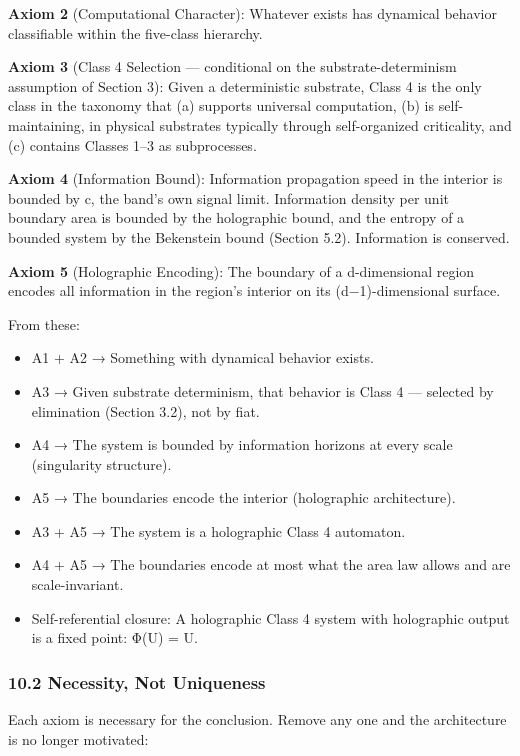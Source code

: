 \documentclass[
]{article}
\providecommand{\tightlist}{%
  \setlength{\itemsep}{0pt}\setlength{\parskip}{0pt}}
\begin{document}
\textbf{Axiom 2} (Computational Character): Whatever exists has
dynamical behavior classifiable within the five-class hierarchy.

\textbf{Axiom 3} (Class 4 Selection --- conditional on the
substrate-determinism assumption of Section 3): Given a deterministic
substrate, Class 4 is the only class in the taxonomy that (a) supports
universal computation, (b) is self-maintaining, in physical substrates
typically through self-organized criticality, and (c) contains Classes
1--3 as subprocesses.

\textbf{Axiom 4} (Information Bound): Information propagation speed in
the interior is bounded by c, the band's own signal limit. Information
density per unit boundary area is bounded by the holographic bound, and
the entropy of a bounded system by the Bekenstein bound (Section 5.2).
Information is conserved.

\textbf{Axiom 5} (Holographic Encoding): The boundary of a d-dimensional
region encodes all information in the region's interior on its
(d−1)-dimensional surface.

From these:

\begin{itemize}
\tightlist
\item
  A1 + A2 → Something with dynamical behavior exists.
\item
  A3 → Given substrate determinism, that behavior is Class 4 ---
  selected by elimination (Section 3.2), not by fiat.
\item
  A4 → The system is bounded by information horizons at every scale
  (singularity structure).
\item
  A5 → The boundaries encode the interior (holographic architecture).
\item
  A3 + A5 → The system is a holographic Class 4 automaton.
\item
  A4 + A5 → The boundaries encode at most what the area law allows and
  are scale-invariant.
\item
  Self-referential closure: A holographic Class 4 system with
  holographic output is a fixed point: Φ(U) = U.
\end{itemize}

\hypertarget{necessity-not-uniqueness}{%
\subsubsection{10.2 Necessity, Not
Uniqueness}\label{necessity-not-uniqueness}}

Each axiom is necessary for the conclusion. Remove any one and the
architecture is no longer motivated:
\end{document}
